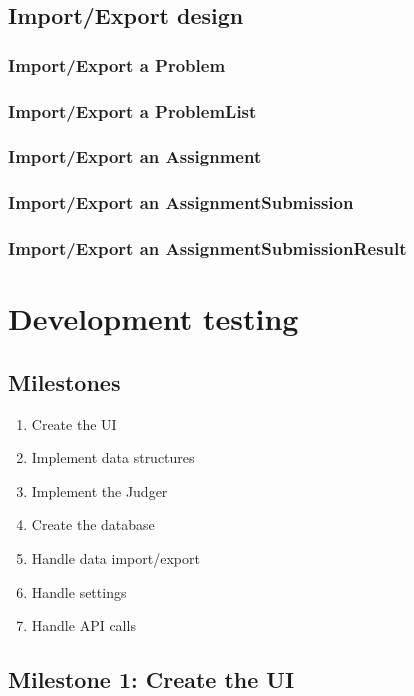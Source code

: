 \documentclass[a4paper]{report}
\begin{document}
\subsection{Import/Export design}

\subsubsection{Import/Export a Problem}

\subsubsection{Import/Export a ProblemList}

\subsubsection{Import/Export an Assignment}

\subsubsection{Import/Export an AssignmentSubmission}

\subsubsection{Import/Export an AssignmentSubmissionResult}

\section{Development testing}

\subsection{Milestones}

\begin{enumerate}
    \item Create the UI
    \item Implement data structures
    \item Implement the Judger
    \item Create the database
    \item Handle data import/export
    \item Handle settings
    \item Handle API calls
\end{enumerate}

\subsection{Milestone 1: Create the UI}
\end{document}
